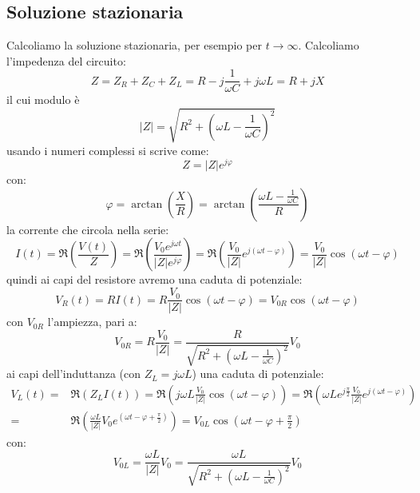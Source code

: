 \subsection{Soluzione stazionaria}
Calcoliamo la soluzione stazionaria, per esempio per $t\to\infty$. Calcoliamo l'impedenza del circuito:
\begin{equation}
  Z=Z_R+Z_C+Z_L=R-j\frac{1}{\omega C}+j\omega L=R+j X
\end{equation}
il cui modulo è
\begin{equation}
  |Z|=\sqrt{R^2+\left(\omega L-\frac{1}{\omega C}\right)^2}
\end{equation}
usando i numeri complessi si scrive come:
\begin{equation}
  Z=|Z|e^{j\varphi}
\end{equation}
con:
\begin{equation}
  \varphi=\arctan\left(\frac{X}{R}\right)=\arctan\left(\frac{\omega L-\frac{1}{\omega C}}{R}\right)
\end{equation}
la corrente che circola nella serie:
\begin{equation}
  I(t)=\Re\left({\frac{V(t)}{Z}}\right)=\Re\left({\frac{V_0e^{j\omega t}}{|Z|e^{j\varphi}}}\right)=\Re\left({\frac{V_0}{|Z|}e^{j(\omega t-\varphi)}}\right)=\frac{V_0}{|Z|}\cos(\omega t-\varphi)
\end{equation}
quindi ai capi del resistore avremo una caduta di potenziale:
\begin{equation}
  V_R(t)=RI(t)=R\frac{V_0}{|Z|}\cos(\omega t-\varphi)=V_{0R}\cos(\omega t-\varphi)
\end{equation}
con $V_{0R}$ l'ampiezza, pari a:
\begin{equation}
  V_{0R}=R\frac{V_0}{|Z|}=\frac{R}{\sqrt{R^2+\left(\omega L-\frac{1}{\omega C}\right)^2}}V_0
\end{equation}
ai capi dell'induttanza (con $Z_L=j\omega L$) una caduta di potenziale:
\begin{equation}
  \begin{split}
    V_L(t)=&\Re\left(Z_LI(t)\right)=\Re\left(j\omega L\frac{V_0}{|Z|}\cos(\omega t-\varphi)\right)=\Re\left(\omega Le^{j\frac{\pi}{2}}\frac{V_0}{|Z|}e^{j(\omega t-\varphi)}\right)\\
    =&\Re\left(\frac{\omega L}{|Z|}V_0e^{\left(\omega t-\varphi+\frac{\pi}{2}\right)}\right)=V_{0L}\cos\left(\omega t-\varphi+\frac{\pi}{2}\right)
  \end{split}
\end{equation}
con:
\begin{equation}
  V_{0L}=\frac{\omega L}{|Z|}V_0=\frac{\omega L}{\sqrt{R^2+\left(\omega L-\frac{1}{\omega C}\right)^2}}V_0
\end{equation}
